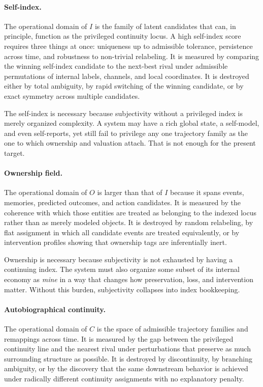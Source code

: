 \documentclass[11pt,a4paper]{article}
\theoremstyle{definition}
\newcommand{\SelfIndex}{I}
\newcommand{\OwnField}{O}
\newcommand{\ContField}{C}
\begin{document}
\paragraph{Self-index.}
The operational domain of $\SelfIndex$ is the family of latent candidates that can, in principle, function as the privileged continuity locus. A high self-index score requires three things at once: uniqueness up to admissible tolerance, persistence across time, and robustness to non-trivial relabeling. It is measured by comparing the winning self-index candidate to the next-best rival under admissible permutations of internal labels, channels, and local coordinates. It is destroyed either by total ambiguity, by rapid switching of the winning candidate, or by exact symmetry across multiple candidates.

The self-index is necessary because subjectivity without a privileged index is merely organized complexity. A system may have a rich global state, a self-model, and even self-reports, yet still fail to privilege any one trajectory family as the one to which ownership and valuation attach. That is not enough for the present target.

\paragraph{Ownership field.}
The operational domain of $\OwnField$ is larger than that of $\SelfIndex$ because it spans events, memories, predicted outcomes, and action candidates. It is measured by the coherence with which those entities are treated as belonging to the indexed locus rather than as merely modeled objects. It is destroyed by random relabeling, by flat assignment in which all candidate events are treated equivalently, or by intervention profiles showing that ownership tags are inferentially inert.

Ownership is necessary because subjectivity is not exhausted by having a continuing index. The system must also organize some subset of its internal economy as \emph{mine} in a way that changes how preservation, loss, and intervention matter. Without this burden, subjectivity collapses into index bookkeeping.

\paragraph{Autobiographical continuity.}
The operational domain of $\ContField$ is the space of admissible trajectory families and remappings across time. It is measured by the gap between the privileged continuity line and the nearest rival under perturbations that preserve as much surrounding structure as possible. It is destroyed by discontinuity, by branching ambiguity, or by the discovery that the same downstream behavior is achieved under radically different continuity assignments with no explanatory penalty.
\end{document}
